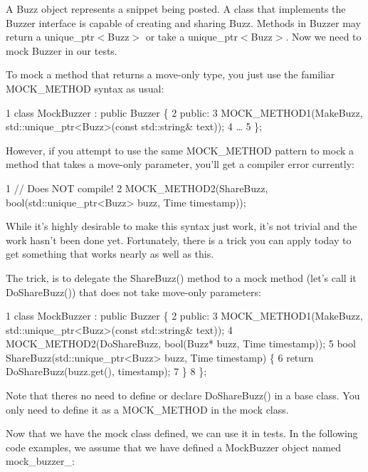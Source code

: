 A {\ttfamily Buzz} object represents a snippet being posted. A class that implements the {\ttfamily Buzzer} interface is capable of creating and sharing {\ttfamily Buzz}. Methods in {\ttfamily Buzzer} may return a {\ttfamily unique\+\_\+ptr$<$Buzz$>$} or take a {\ttfamily unique\+\_\+ptr$<$Buzz$>$}. Now we need to mock {\ttfamily Buzzer} in our tests.

To mock a method that returns a move-\/only type, you just use the familiar {\ttfamily M\+O\+C\+K\+\_\+\+M\+E\+T\+H\+OD} syntax as usual\+:


\begin{DoxyCode}
1 class MockBuzzer : public Buzzer \{
2  public:
3   MOCK\_METHOD1(MakeBuzz, std::unique\_ptr<Buzz>(const std::string& text));
4   …
5 \};
\end{DoxyCode}


However, if you attempt to use the same {\ttfamily M\+O\+C\+K\+\_\+\+M\+E\+T\+H\+OD} pattern to mock a method that takes a move-\/only parameter, you’ll get a compiler error currently\+:


\begin{DoxyCode}
1 // Does NOT compile!
2 MOCK\_METHOD2(ShareBuzz, bool(std::unique\_ptr<Buzz> buzz, Time timestamp));
\end{DoxyCode}


While it’s highly desirable to make this syntax just work, it’s not trivial and the work hasn’t been done yet. Fortunately, there is a trick you can apply today to get something that works nearly as well as this.

The trick, is to delegate the {\ttfamily Share\+Buzz()} method to a mock method (let’s call it {\ttfamily Do\+Share\+Buzz()}) that does not take move-\/only parameters\+:


\begin{DoxyCode}
1 class MockBuzzer : public Buzzer \{
2  public:
3   MOCK\_METHOD1(MakeBuzz, std::unique\_ptr<Buzz>(const std::string& text));
4   MOCK\_METHOD2(DoShareBuzz, bool(Buzz* buzz, Time timestamp));
5   bool ShareBuzz(std::unique\_ptr<Buzz> buzz, Time timestamp) \{
6     return DoShareBuzz(buzz.get(), timestamp);
7   \}
8 \};
\end{DoxyCode}


Note that there\textquotesingle{}s no need to define or declare {\ttfamily Do\+Share\+Buzz()} in a base class. You only need to define it as a {\ttfamily M\+O\+C\+K\+\_\+\+M\+E\+T\+H\+OD} in the mock class.

Now that we have the mock class defined, we can use it in tests. In the following code examples, we assume that we have defined a {\ttfamily Mock\+Buzzer} object named {\ttfamily mock\+\_\+buzzer\+\_\+}\+:



